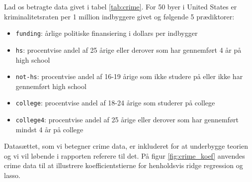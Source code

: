 Lad os betragte data givet i tabel \ref{tab:crime}.
For 50 byer i United States er kriminalitetsraten per 1 million indbyggere givet og følgende 5 prædiktorer: 
\begin{itemize}
\item \texttt{funding}: årlige politiske finansiering i dollars per indbygger
\item \texttt{hs}: procentvise andel af 25 årige eller derover som har gennemført 4 år på high school
\item \texttt{not-hs}: procentvise andel af 16-19 årige som ikke studere på eller ikke har gennemført high school
\item \texttt{college}: procentvise andel af 18-24 årige som studerer på college
\item \texttt{college4}: procentvise andel af 25 årige eller derover som har gennemført mindst 4 år på college
\end{itemize}
%

%
Datasættet, som vi betegner crime data, er inkluderet for at underbygge teorien og vi vil løbende i rapporten referere til det.
På figur \ref{fig:crime_koef} anvendes crime data til at illustrere koefficientstierne for henholdsvis ridge regression og lasso.
%
